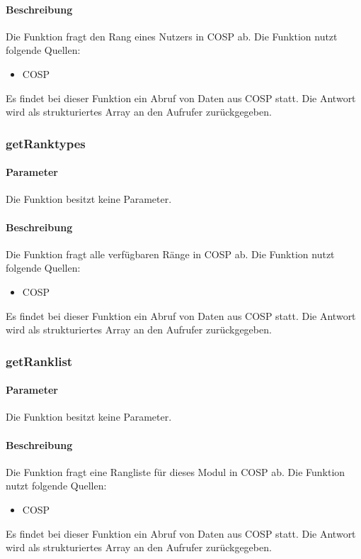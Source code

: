 \paragraph{Beschreibung} Die Funktion fragt den Rang eines Nutzers in {\glqq COSP\grqq} ab. Die Funktion nutzt folgende Quellen:
\begin{itemize}
	\item COSP
\end{itemize}
Es findet bei dieser Funktion ein Abruf von Daten aus {\glqq COSP\grqq} statt. Die Antwort wird als strukturiertes Array an den Aufrufer zurückgegeben.
\subsubsection{getRanktypes}
\paragraph{Parameter} Die Funktion besitzt keine Parameter.
\paragraph{Beschreibung} Die Funktion fragt alle verfügbaren Ränge in {\glqq COSP\grqq} ab. Die Funktion nutzt folgende Quellen:
\begin{itemize}
	\item COSP
\end{itemize}
Es findet bei dieser Funktion ein Abruf von Daten aus {\glqq COSP\grqq} statt. Die Antwort wird als strukturiertes Array an den Aufrufer zurückgegeben.
\subsubsection{getRanklist}
\paragraph{Parameter} Die Funktion besitzt keine Parameter.
\paragraph{Beschreibung} Die Funktion fragt eine Rangliste für dieses Modul in {\glqq COSP\grqq} ab. Die Funktion nutzt folgende Quellen:
\begin{itemize}
	\item COSP
\end{itemize}
Es findet bei dieser Funktion ein Abruf von Daten aus {\glqq COSP\grqq} statt. Die Antwort wird als strukturiertes Array an den Aufrufer zurückgegeben.
